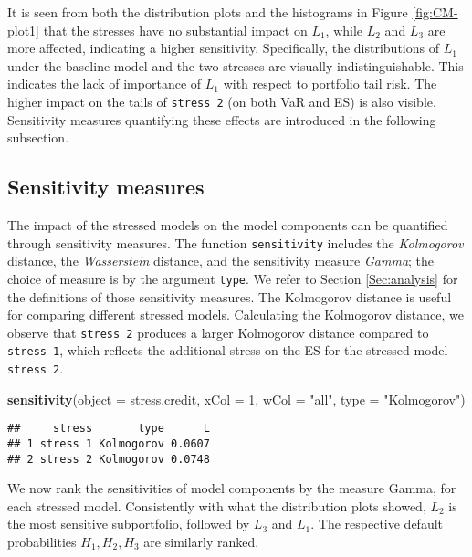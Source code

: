 \documentclass[
]{article}
\newenvironment{Shaded}{\begin{snugshade}}{\end{snugshade}}
\newcommand{\DataTypeTok}[1]{\textcolor[rgb]{0.13,0.29,0.53}{#1}}
\newcommand{\DecValTok}[1]{\textcolor[rgb]{0.00,0.00,0.81}{#1}}
\newcommand{\KeywordTok}[1]{\textcolor[rgb]{0.13,0.29,0.53}{\textbf{#1}}}
\newcommand{\NormalTok}[1]{#1}
\newcommand{\StringTok}[1]{\textcolor[rgb]{0.31,0.60,0.02}{#1}}
\begin{document}
It is seen from both the distribution plots and the histograms in Figure \ref{fig:CM-plot1} that the stresses have no substantial impact on \(L_1\), while \(L_2\) and \(L_3\) are more affected, indicating a higher sensitivity. Specifically, the distributions of \(L_1\) under the baseline model and the two stresses are visually indistinguishable. This indicates the lack of importance of \(L_1\) with respect to portfolio tail risk. The higher impact on the tails of \texttt{stress\ 2} (on both VaR and ES) is also visible. Sensitivity measures quantifying these effects are introduced in the following subsection.

\hypertarget{sensitivity-measures-1}{%
\subsection{Sensitivity measures}\label{sensitivity-measures-1}}

The impact of the stressed models on the model components can be quantified through sensitivity measures. The function \texttt{sensitivity} includes the \emph{Kolmogorov} distance, the \emph{Wasserstein} distance, and the sensitivity measure \emph{Gamma}; the choice of measure is by the argument \texttt{type}. We refer to Section \ref{Sec:analysis} for the definitions of those sensitivity measures. The Kolmogorov distance is useful for comparing different stressed models. Calculating the Kolmogorov distance, we observe that \texttt{stress\ 2} produces a larger Kolmogorov distance compared to \texttt{stress\ 1}, which reflects the additional stress on the ES for the stressed model \texttt{stress\ 2}.

\begin{Shaded}
\begin{Highlighting}[]
\KeywordTok{sensitivity}\NormalTok{(}\DataTypeTok{object =}\NormalTok{ stress.credit, }\DataTypeTok{xCol =} \DecValTok{1}\NormalTok{, }\DataTypeTok{wCol =} \StringTok{"all"}\NormalTok{, }\DataTypeTok{type =} \StringTok{"Kolmogorov"}\NormalTok{)}
\end{Highlighting}
\end{Shaded}

\begin{verbatim}
##     stress       type      L
## 1 stress 1 Kolmogorov 0.0607
## 2 stress 2 Kolmogorov 0.0748
\end{verbatim}

We now rank the sensitivities of model components by the measure Gamma, for each stressed model. Consistently with what the distribution plots showed, \(L_2\) is the most sensitive subportfolio, followed by \(L_3\) and \(L_1\). The respective default probabilities \(H_1,H_2,H_3\) are similarly ranked.
\end{document}
